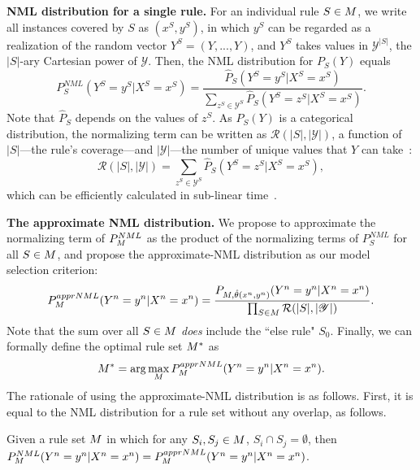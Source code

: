 \smallskip
\noindent \textbf{NML distribution for a single rule.}
For an individual rule $S \in M$, we write all instances covered by $S$ as $(x^S, y^S)$, in which $y^S$ can be regarded as a realization of the random vector $Y^S = (Y, ..., Y)$, and $Y^S$ takes values in $\mathscr{Y}^{|S|}$, the $|S|$-ary Cartesian power of $\mathscr{Y}$. Then, the NML distribution for $P_S(Y)$ equals
\begin{equation}
    P^{NML}_S(Y^S = y^{S}|X^S = x^S) = \frac{\hat{P}_S(Y^S = y^S|X^S = x^S)}{\sum_{z^S \in \mathscr{Y}^S} \hat{P}_S(Y^S = z^S|X^S = x^S)}.
\end{equation}
Note that $\hat{P}_{S}$ depends on the values of $z^S$. As $\hat{P}_S(Y)$ is a categorical distribution, the normalizing term can be written as $\mathcal{R}(|S|, |\mathscr{Y}|)$, a function of $|S|$---the rule's coverage---and $|\mathscr{Y}|$---the number of unique values that $Y$ can take~\citep{mononen:08:sub-lin-stoch-comp}:
\begin{equation}
    \mathcal{R}(|S|, |\mathscr{Y}|) = \sum_{z^S \in \mathscr{Y}^S} \hat{P}_S(Y^S = z^S|X^S = x^S),
\end{equation}
which can be efficiently calculated in sub-linear time~\citep{mononen:08:sub-lin-stoch-comp}.

\smallskip
\noindent \textbf{The approximate NML distribution.}
We propose to approximate the normalizing term of $P^{NML}_{M}$ as the product of the normalizing terms of $P^{NML}_S$ for all $S \in M$, and propose the approximate-NML distribution as our model selection criterion:
\begin{equation}
    P^{apprNML}_{M}(Y^n =y^n | X^n=x^n) = \frac{P_{M, \hat{\theta}(x^n, y^n)}(Y^n=y^n|X^n=x^n)}{\prod_{S \in M} \mathcal{R}(|S|, |\mathscr{Y}|)}.
\end{equation}
Note that the sum over all $S \in M$ \emph{does} include the ``else rule" $S_0$. Finally, we can formally define the optimal rule set $M^*$ as
\begin{equation}
    M^* = \arg \max_{M} P^{apprNML}_{M}(Y^n =y^n | X^n=x^n).
\end{equation}
The rationale of using the approximate-NML distribution is as follows. First, it is equal to the NML distribution for a rule set without any overlap, as follows.
\begin{proposition}
Given a rule set $M$ in which for any $S_i, S_j \in M$, $S_i \cap S_j = \emptyset$, then $P^{NML}_{M}(Y^n=y^n|X^n=x^n) = P^{apprNML}_{M}(Y^n=y^n|X^n=x^n)$.
\end{proposition}


